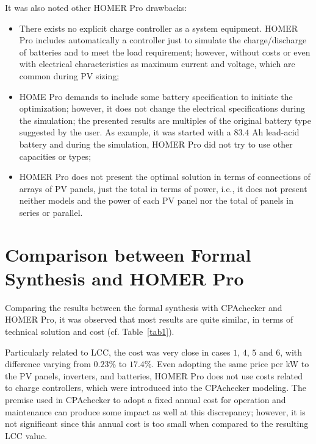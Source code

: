 It was also noted other HOMER Pro drawbacks:

\begin{itemize}
\item There exists no explicit charge controller 
as a system equipment. HOMER Pro includes automatically 
a controller just to simulate the charge/discharge 
of batteries and to meet the load requirement; however, 
without costs or even with electrical characteristics 
as maximum current and voltage, which are common during PV sizing;
\item HOME Pro demands to include some battery specification 
to initiate the optimization; however, it does not change 
the electrical specifications during the simulation; 
the presented results are multiples of the original 
battery type suggested by the user. As example, it was 
started with a $83.4$ Ah lead-acid battery and during 
the simulation, HOMER Pro did not try to use other capacities or types;
\item HOMER Pro does not present the optimal solution 
in terms of connections of arrays of PV panels, just the 
total in terms of power, i.e., it does not present neither models 
and the power of each PV panel nor the total of panels in series or parallel. 
\end{itemize}

\section{Comparison between Formal Synthesis and HOMER Pro}

Comparing the results between the formal synthesis with CPAchecker 
and HOMER Pro, it was observed that most results are quite similar, 
in terms of technical solution and cost (cf. Table~\ref{tab1}). 

Particularly related to LCC, the cost was very close in cases 
$1$, $4$, $5$ and $6$, with difference varying from $0.23$\% to $17.4$\%. 
Even adopting the same price per kW to the PV panels, 
inverters, and batteries, HOMER Pro does not use costs 
related to charge controllers, which were introduced into the 
CPAchecker modeling. The premise used in CPAchecker to adopt 
a fixed annual cost for operation and maintenance can produce 
some impact as well at this discrepancy; however, it is not significant
since this annual cost is too small when compared to the resulting LCC value.

